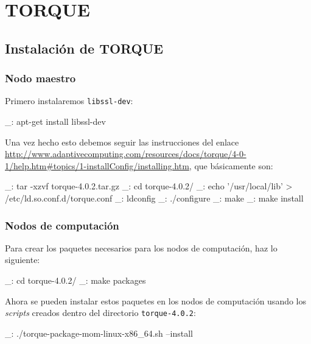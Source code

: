 \chapter{TORQUE}
\label{anx:torque}

\section{Instalación de TORQUE}


\subsection{Nodo maestro}

Primero instalaremos \texttt{libssl-dev}:

\begin{bashcode}
_: apt-get install libssl-dev
\end{bashcode}

Una vez hecho esto debemos seguir las instrucciones del enlace \url{http://www.adaptivecomputing.com/resources/docs/torque/4-0-1/help.htm#topics/1-installConfig/installing.htm}, que básicamente son:

\begin{bashcode}
_: tar -xzvf torque-4.0.2.tar.gz
_: cd torque-4.0.2/
_: echo '/usr/local/lib' > /etc/ld.so.conf.d/torque.conf
_: ldconfig
_: ./configure
_: make
_: make install
\end{bashcode}


\subsection{Nodos de computación}

Para crear los paquetes necesarios para los nodos de computación, haz lo siguiente:

\begin{bashcode}
_: cd torque-4.0.2/
_: make packages
\end{bashcode}

Ahora se pueden instalar estos paquetes en los nodos de computación usando los \emph{scripts} creados dentro del directorio \texttt{torque-4.0.2}:

\begin{bashcode}
_: ./torque-package-mom-linux-x86_64.sh --install
\end{bashcode}

